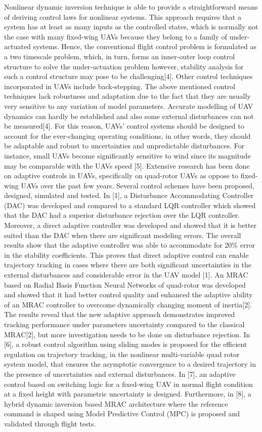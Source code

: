 \documentclass[12pt]{article}
\begin{document}
Nonlinear dynamic inversion technique is able to provide a straightforward means of deriving control laws for nonlinear systems. This approach requires that a system has at least as many inputs as the controlled states, which is normally not the case with many fixed-wing UAVs because they belong to a family of under-actuated systems. Hence, the conventional flight control problem is formulated as a two timescale problem, which, in turn, forms an inner-outer loop control structure to solve the under-actuation problem however, stability analysis for such a control structure may pose to be challenging[4]. Other control techniques incorporated in UAVs include back-stepping. 
The above mentioned control techniques lack robustness and adaptation due to the fact that they are usually very sensitive to any variation of model parameters. Accurate modelling of UAV dynamics can hardly be established and also some external disturbances can not be measured[4]. For this reason, UAVs’ control systems should be designed to account for the ever-changing operating conditions, in other words, they should be adaptable and robust to uncertainties and unpredictable disturbances. For instance, small UAVs become significantly sensitive to wind since its magnitude may be comparable with the UAVs speed [5].
Extensive research has been done on adaptive controls in UAVs, specifically on quad-rotor UAVs as oppose to fixed-wing UAVs over the past few years. Several control schemes have been proposed, designed, simulated and tested. In [1], a Disturbance Accommodating Controller (DAC) was developed and compared to a standard LQR controller which showed that the DAC had a superior disturbance rejection over the LQR controller. Moreover, a direct adaptive controller was developed and showed that it is better suited than the DAC when there are significant modeling errors. The overall results show that the adaptive controller was able to accommodate for 20\% error in the stability coefficients. This proves that direct adaptive control can enable trajectory tracking in cases where there are both significant uncertainties in the external disturbances and considerable error in the UAV model [1]. An MRAC based on Radial Basis Function Neural Networks of quad-rotor was developed and showed that it had better control quality and enhanced the adaptive ability of an MRAC controller to overcome dynamically changing moment of inertia[2]. The results reveal that the new adaptive approach demonstrates improved tracking performance under parameters uncertainty compared to the classical MRAC[2], but more investigation needs to be done on disturbance rejection. In [6], a robust control algorithm using sliding modes is proposed for the efficient regulation on trajectory tracking, in the nonlinear multi-variable quad rotor system model, that ensures the asymptotic convergence to a desired trajectory in the presence of uncertainties and external disturbances. In [7], an adaptive control based on switching logic for a fixed-wing UAV in normal flight condition at a fixed height with parametric uncertainty is designed. Furthermore, in [8], a hybrid dynamic inversion based MRAC architecture where the reference command is shaped using Model Predictive Control (MPC) is proposed and validated through flight tests.
\end{document}
